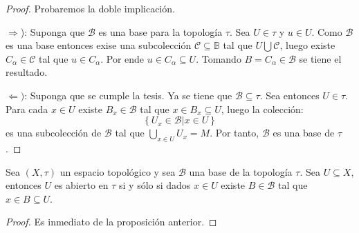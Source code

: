 \documentclass[12pt]{report}
\theoremstyle{largebreak}
\begin{document}
    \begin{proof}
        Probaremos la doble implicación.

        $\Rightarrow$): Suponga que $\mathcal{B}$ es una base para la topología $\tau$. Sea $U\in \tau$ y $u\in U$. Como $\mathcal{B}$ es una base entonces exise una subcolección $\mathcal{C}\subseteq\mathbb{B}$ tal que $U\bigcup\mathcal{C}$, luego existe $C_\alpha\in\mathcal{C}$ tal que $u\in C_\alpha$. Por ende $u\in C_\alpha\subseteq U$. Tomando $B=C_\alpha\in\mathcal{B}$ se tiene el resultado.

        $\Leftarrow)$: Suponga que se cumple la tesis. Ya se tiene que $\mathcal{B}\subseteq\tau$. Sea entonces $U\in\tau$. Para cada $x\in U$ existe $B_x\in\mathcal{B}$ tal que $x\in B_x\subseteq U$, luego la colección:
        \begin{equation*}
            \left\{U_x\in\mathcal{B}\big| x\in U \right\}
        \end{equation*}
        es una subcolección de $\mathcal{B}$ tal que $\bigcup_{x\in U}U_x=M$. Por tanto, $\mathcal{B}$ es una base de $\tau$.
    \end{proof}

    \begin{cor}
        Sea $(X,\tau)$ un espacio topológico y sea $\mathcal{B}$ una base de la topología $\tau$. Sea $U\subseteq X$, entonces $U$ es abierto en $\tau$ si y sólo si dados $x\in U$ existe $B\in\mathcal{B}$ tal que $x\in B\subseteq U$.
    \end{cor}

    \begin{proof}
        Es inmediato de la proposición anterior.
    \end{proof}
\end{document}
